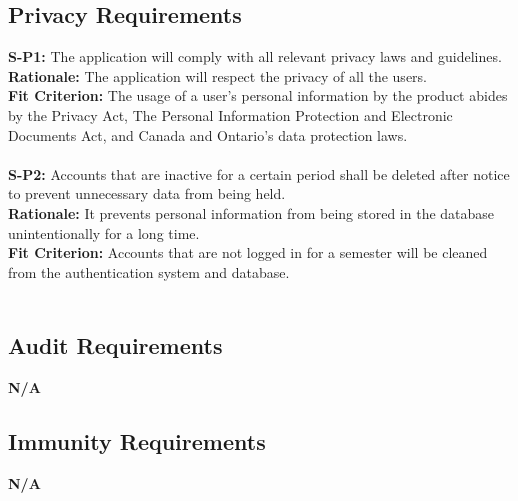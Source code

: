 \documentclass{article}
\begin{document}
\subsection{Privacy Requirements}
\textbf{S-P1:} The application will comply with all relevant privacy laws and guidelines.\\
\textbf{Rationale:} The application will respect the privacy of all the users.\\
\textbf{Fit Criterion:} The usage of a user’s personal information by the product abides by the Privacy Act, The Personal Information Protection and Electronic Documents Act, and Canada and Ontario’s data protection laws.\\\\
\textbf{S-P2:} Accounts that are inactive for a certain period shall be deleted after notice to prevent unnecessary data from being held.\\
\textbf{Rationale:} It prevents personal information from being stored in the database unintentionally for a long time.\\
\textbf{Fit Criterion:} Accounts that are not logged in for a semester will be cleaned from the authentication system and database.\\\\

\subsection{Audit Requirements}

\textbf{N/A}

\subsection{Immunity Requirements}

\textbf{N/A}
\end{document}
